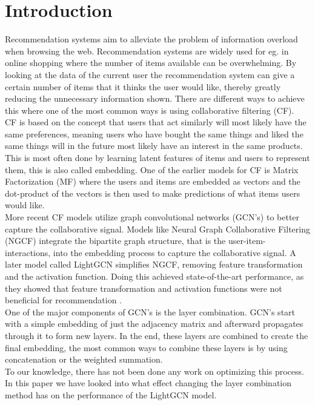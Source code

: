 \section{Introduction}
Recommendation systems aim to alleviate the problem of information overload when browsing the web.
Recommendation systems are widely used for eg. in online shopping where the number of items available can be overwhelming.
By looking at the data of the current user the recommendation system can give a certain number of items that it thinks the user would like, thereby greatly reducing the unnecessary information shown.
There are different ways to achieve this where one of the most common ways is using collaborative filtering (CF).
\\
CF is based on the concept that users that act similarly will most likely have the same preferences, meaning users who have bought the same things and liked the same things will in the future most likely have an interest in the same products.
This is most often done by learning latent features of items and users to represent them, this is also called embedding.
One of the earlier models for CF is Matrix Factorization (MF) where the users and items are embedded as vectors and the dot-product of the vectors is then used to make predictions of what items users would like\cite{Matrix-factorization-techniques}.
\\
More recent CF models utilize graph convolutional networks (GCN's) to better capture the collaborative signal.
Models like Neural Graph Collaborative Filtering (NGCF) integrate the bipartite graph structure, that is the user-item-interactions, into the embedding process to capture the collaborative signal\cite{NGCF_2019}.
A later model called LightGCN simplifies NGCF, removing feature transformation and the activation function.
Doing this achieved state-of-the-art performance, as they showed that feature transformation and activation functions were not beneficial for recommendation \cite{lightgcn}.
\\
One of the major components of GCN's is the layer combination.
GCN's start with a simple embedding of just the adjacency matrix and afterward propagates through it to form new layers.
In the end, these layers are combined to create the final embedding, the most common ways to combine these layers is by using concatenation or the weighted summation.
\\
To our knowledge, there has not been done any work on optimizing this process.
In this paper we have looked into what effect changing the layer combination method has on the performance of the LightGCN model.
